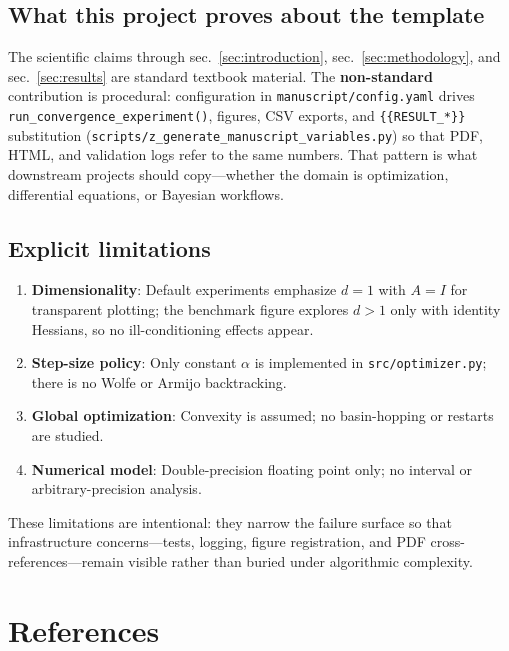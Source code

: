 \documentclass[
]{article}
\providecommand{\tightlist}{%
  \setlength{\itemsep}{0pt}\setlength{\parskip}{0pt}}
\begin{document}
\subsection{What this project proves about the
template}\label{what-this-project-proves-about-the-template}

The scientific claims through sec.~\ref{sec:introduction},
sec.~\ref{sec:methodology}, and sec.~\ref{sec:results} are standard
textbook material. The \textbf{non-standard} contribution is procedural:
configuration in \texttt{manuscript/config.yaml} drives
\texttt{run\_convergence\_experiment()}, figures, CSV exports, and
\texttt{\{\{RESULT\_*\}\}} substitution
(\texttt{scripts/z\_generate\_manuscript\_variables.py}) so that PDF,
HTML, and validation logs refer to the same numbers. That pattern is
what downstream projects should copy---whether the domain is
optimization, differential equations, or Bayesian workflows.

\subsection{Explicit limitations}\label{explicit-limitations}

\begin{enumerate}
\def\labelenumi{\arabic{enumi}.}
\tightlist
\item
  \textbf{Dimensionality}: Default experiments emphasize \(d = 1\) with
  \(A = I\) for transparent plotting; the benchmark figure explores
  \(d > 1\) only with identity Hessians, so no ill-conditioning effects
  appear.
\item
  \textbf{Step-size policy}: Only constant \(\alpha\) is implemented in
  \texttt{src/optimizer.py}; there is no Wolfe or Armijo backtracking.
\item
  \textbf{Global optimization}: Convexity is assumed; no basin-hopping
  or restarts are studied.
\item
  \textbf{Numerical model}: Double-precision floating point only; no
  interval or arbitrary-precision analysis.
\end{enumerate}

These limitations are intentional: they narrow the failure surface so
that infrastructure concerns---tests, logging, figure registration, and
PDF cross-references---remain visible rather than buried under
algorithmic complexity.

\newpage

\section{References}\label{sec:references}
\end{document}
